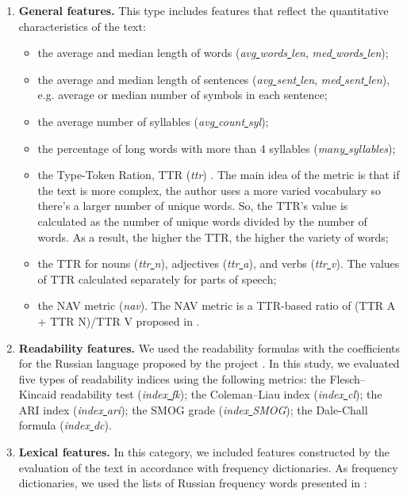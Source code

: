 \documentclass[runningheads]{llncs}
\begin{document}
\begin{enumerate}
    \item 
    \textbf{General features.} This type includes features that reflect the quantitative characteristics of the text:
    \begin{itemize}
        \item the average and median length of words (\textit{avg\underline{ }words\underline{ }len}, \textit{med\underline{ }words\underline{ }len});
        \item the average and median length of sentences (\textit{avg\underline{ }sent\underline{ }len}, \textit{med\underline{ }sent\underline{ }len}), e.g. average or median number of symbols in each sentence;
        \item the average number of syllables (\textit{avg\underline{ }count\underline{ }syl});
        \item the percentage of long words with more than 4 syllables (\textit{many\underline{ }syllables});
        \item the Type-Token Ration, TTR (\textit{ttr}) \cite{Templin}. The main idea of the metric is that if the text is more complex, the author uses a more varied vocabulary so there’s a larger number of unique words. So, the TTR's value is calculated as the number of unique words divided by the number of words. As a result, the higher the TTR, the higher the variety of words;
        \item the TTR for nouns (\textit{ttr\underline{ }n}), adjectives (\textit{ttr\underline{ }a}), and verbs (\textit{ttr\underline{ }v}). The values of TTR calculated separately for parts of speech;
        \item the NAV metric (\textit{nav}). The NAV metric is a TTR-based ratio of (TTR A + TTR N)/TTR V proposed in \cite{Solnyshkina}.
    \end{itemize}
    \item 
    \textbf{Readability features.} We used the readability formulas with the coefficients for the Russian language proposed by the project \cite{readability}. In this study, we evaluated five types of readability indices using the following metrics: the Flesch–Kincaid readability test (\textit{index\underline{ }fk}); the Coleman–Liau index  (\textit{index\underline{ }cl}); the ARI index (\textit{index\underline{ }ari}); the SMOG grade (\textit{index\underline{ }SMOG}); the Dale-Chall formula  (\textit{index\underline{ }dc}).
    \item
    \textbf{Lexical features.} In this category, we included features constructed by the evaluation of the text in accordance with frequency dictionaries. As frequency dictionaries, we used the lists of Russian frequency words presented in \cite{Lyashevskaya,Sharoff}:

\end{enumerate}
\end{document}
